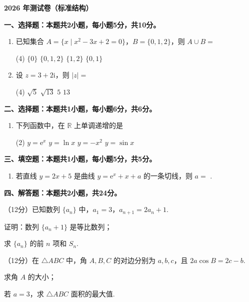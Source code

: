 \documentclass[12pt, a4paper, oneside]{ctexart}
\newcommand{\blank}{\underline{\hspace{2cm}}}
\newcommand{\mi}{\mathrm{i}}
\newcommand{\me}{\mathrm{e}}
\newcommand{\answern}{%
  \par\vspace{3em}%
}
\begin{document}
\begin{center}
    \LARGE{\textbf{2026 年测试卷（标准结构）}}
\end{center}

\vspace{0.5em}

\noindent\textbf{一、选择题：本题共2小题，每小题5分，共10分。}

\begin{enumerate}[itemsep=0.3em]
    \item 已知集合 $A=\{x \mid x^2-3x+2=0\}$，$B=\{0,1,2\}$，则 $A \cup B =$
    \begin{tasks}(4)
        \task $\{0\}$
        \task $\{0,1,2\}$
        \task $\{1,2\}$
        \task $\{0,1\}$
    \end{tasks}

    \item 设 $z = 3 + 2\mi$，则 $|z| =$
    \begin{tasks}(4)
        \task $\sqrt{5}$
        \task $\sqrt{13}$
        \task $5$
        \task $13$
    \end{tasks}
\end{enumerate}

\noindent\textbf{二、选择题：本题共1小题，每小题6分，共6分。}

\begin{enumerate}[start=3, itemsep=0.5em]
    \item 下列函数中，在 $\mathbb{R}$ 上单调递增的是
    \begin{tasks}(2)
        \task $y = \me^{x}$
        \task $y = \ln x$
        \task $y = -x^{2}$
        \task $y = \sin x$
    \end{tasks}
\end{enumerate}

\noindent\textbf{三、填空题：本题共1小题，每小题5分，共5分。}

\begin{enumerate}[start=4, itemsep=0.8em]
    \item 若直线 $y=2x+5$ 是曲线 $y=\me^{x}+x+a$ 的一条切线，则 $a=$ \blank.
\end{enumerate}

\noindent\textbf{四、解答题：本题共2小题，共24分。}

\begin{examenum}[start=5, itemsep=2.0cm]
    \item （12分）已知数列 $\{a_n\}$ 中，$a_1=3$，$a_{n+1}=2a_n+1$.
    \begin{examenum}
        \item 证明：数列 $\{a_n+1\}$ 是等比数列；
        \item 求 $\{a_n\}$ 的前 $n$ 项和 $S_n$.
    \end{examenum}
    \answern

    \item （12分）在 $\triangle ABC$ 中，角 $A,B,C$ 的对边分别为 $a,b,c$，且 $2a\cos B = 2c - b$.
    \begin{examenum}
        \item 求角 $A$ 的大小；
        \item 若 $a=3$，求 $\triangle ABC$ 面积的最大值.
    \end{examenum}
\end{examenum}
\end{document}
